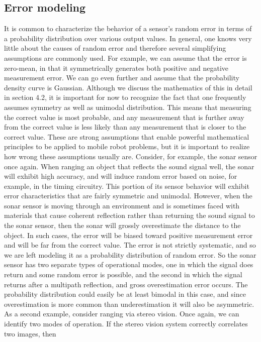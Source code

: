 \subsection{Error modeling}
It is common to characterize the behavior of a sensor’s
random error in terms of a probability distribution over various output values.
In general,
one knows very little about the causes of random error and therefore several simplifying
assumptions are commonly used. For example, we can assume that the error is zero-mean,
in that it symmetrically generates both positive and negative measurement error. We can
go even further and assume that the probability density curve is Gaussian. Although we discuss 
the mathematics of this in detail in section 4.2, it is important for now to recognize the
fact that one frequently assumes symmetry as well as unimodal distribution. This means
that measuring the correct value is most probable, and any measurement that is further
away from the correct value is less likely than any measurement that is closer to the correct
value. These are strong assumptions that enable powerful mathematical principles to be
applied to mobile robot problems, but it is important to realize how wrong these assumptions 
usually are.
Consider, for example, the sonar sensor once again. When ranging an object that reflects
the sound signal well, the sonar will exhibit high accuracy, and will induce random error
based on noise, for example, in the timing circuitry. This portion of its sensor behavior will
exhibit error characteristics that are fairly symmetric and unimodal. However, when the
sonar sensor is moving through an environment and is sometimes faced with materials that
cause coherent reflection rather than returning the sound signal to the sonar sensor, then the
sonar will grossly overestimate the distance to the object. In such cases, the error will be
biased toward positive measurement error and will be far from the correct value. The error
is not strictly systematic, and so we are left modeling it as a probability distribution of
random error. So the sonar sensor has two separate types of operational modes, one in
which the signal does return and some random error is possible, and the second in which
the signal returns after a multipath reflection, and gross overestimation error occurs. The
probability distribution could easily be at least bimodal in this case, and since overestimation 
is more common than underestimation it will also be asymmetric.
As a second example, consider ranging via stereo vision. Once again, we can identify
two modes of operation. If the stereo vision system correctly correlates two images, then
